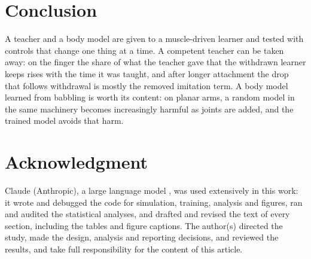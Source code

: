 \documentclass[journal]{IEEEtran}
\begin{document}
\section{Conclusion}
A teacher and a body model are given to a muscle-driven learner and tested
with controls that change one thing at a time. A competent teacher can be taken
away: on the finger the share of what the teacher gave that the withdrawn
learner keeps rises with the time it was taught, and after longer attachment
the drop that follows withdrawal is mostly the removed imitation term. A body
model learned from babbling is worth its content: on planar arms, a random
model in the same machinery becomes increasingly harmful as joints are added,
and the trained model avoids that harm.

\section*{Acknowledgment}
Claude (Anthropic), a large language model \cite{claude2026}, was used
extensively in this work: it wrote and
debugged the code for simulation, training, analysis and figures, ran and audited
the statistical analyses, and drafted and revised the text of every section,
including the tables and figure captions. The author(s) directed
the study, made the design, analysis and reporting decisions, and reviewed the
results, and take full responsibility for the content of this article.



\end{document}
